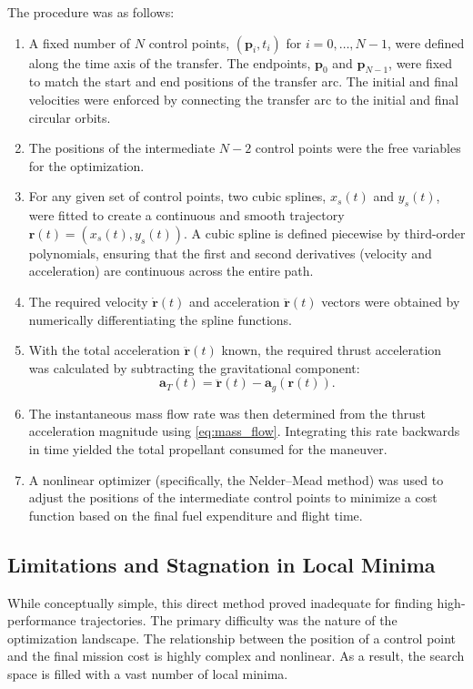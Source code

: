 \documentclass[journal,a4paper]{IEEEtran}
\begin{document}
The procedure was as follows:
{
\renewcommand{\labelenumi}{\arabic{enumi}.}
\begin{enumerate}
    \item A fixed number of $N$ control points, $(\mathbf{p}_i, t_i)$ for $i=0, \dots, N-1$, were defined along the time axis of the transfer. The endpoints, $\mathbf{p}_0$ and $\mathbf{p}_{N-1}$, were fixed to match the start and end positions of the transfer arc. The initial and final velocities were enforced by connecting the transfer arc to the initial and final circular orbits.
    \item The positions of the intermediate $N-2$ control points were the free variables for the optimization.
    \item For any given set of control points, two cubic splines, $x_s(t)$ and $y_s(t)$, were fitted to create a continuous and smooth trajectory $\mathbf{r}(t) = (x_s(t), y_s(t))$. A cubic spline is defined piecewise by third-order polynomials, ensuring that the first and second derivatives (velocity and acceleration) are continuous across the entire path.
    \item The required velocity $\dot{\mathbf{r}}(t)$ and acceleration $\ddot{\mathbf{r}}(t)$ vectors were obtained by numerically differentiating the spline functions.
    \item With the total acceleration $\ddot{\mathbf{r}}(t)$ known, the required thrust acceleration was calculated by subtracting the gravitational component:
    \begin{equation}
        \mathbf{a}_T(t) = \ddot{\mathbf{r}}(t) - \mathbf{a}_g(\mathbf{r}(t)).
    \end{equation}
    \item The instantaneous mass flow rate was then determined from the thrust acceleration magnitude using \eqref{eq:mass_flow}. Integrating this rate backwards in time yielded the total propellant consumed for the maneuver.
    \item A nonlinear optimizer (specifically, the Nelder--Mead method) was used to adjust the positions of the intermediate control points to minimize a cost function based on the final fuel expenditure and flight time.
\end{enumerate}
}

\subsection*{Limitations and Stagnation in Local Minima}
While conceptually simple, this direct method proved inadequate for finding high-performance trajectories. The primary difficulty was the nature of the optimization landscape. The relationship between the position of a control point and the final mission cost is highly complex and nonlinear. As a result, the search space is filled with a vast number of local minima.
\end{document}
